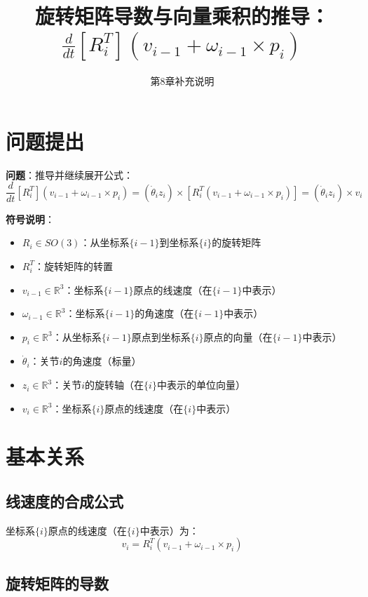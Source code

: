 \documentclass[12pt,a4paper]{article}
\title{旋转矩阵导数与向量乘积的推导：$\frac{d}{dt}[R_i^T](v_{i-1} + \omega_{i-1} \times p_i)$}
\author{第8章补充说明}
\date{}
\begin{document}
\maketitle

\section{问题提出}

\textbf{问题}：推导并继续展开公式：
\begin{equation}
\frac{d}{dt}[R_i^T](v_{i-1} + \omega_{i-1} \times p_i) = (\dot{\theta}_i z_i) \times [R_i^T(v_{i-1} + \omega_{i-1} \times p_i)] = (\dot{\theta}_i z_i) \times v_i
\end{equation}

\textbf{符号说明}：
\begin{itemize}
\item $R_i \in SO(3)$：从坐标系$\{i-1\}$到坐标系$\{i\}$的旋转矩阵
\item $R_i^T$：旋转矩阵的转置
\item $v_{i-1} \in \mathbb{R}^3$：坐标系$\{i-1\}$原点的线速度（在$\{i-1\}$中表示）
\item $\omega_{i-1} \in \mathbb{R}^3$：坐标系$\{i-1\}$的角速度（在$\{i-1\}$中表示）
\item $p_i \in \mathbb{R}^3$：从坐标系$\{i-1\}$原点到坐标系$\{i\}$原点的向量（在$\{i-1\}$中表示）
\item $\dot{\theta}_i$：关节$i$的角速度（标量）
\item $z_i \in \mathbb{R}^3$：关节$i$的旋转轴（在$\{i\}$中表示的单位向量）
\item $v_i \in \mathbb{R}^3$：坐标系$\{i\}$原点的线速度（在$\{i\}$中表示）
\end{itemize}

\section{基本关系}

\subsection{线速度的合成公式}

坐标系$\{i\}$原点的线速度（在$\{i\}$中表示）为：
\begin{equation}
v_i = R_i^T (v_{i-1} + \omega_{i-1} \times p_i) \tag{17}
\end{equation}

\subsection{旋转矩阵的导数}
\end{document}
